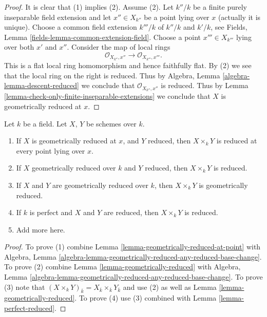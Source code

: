 \begin{proof}
It is clear that (1) implies (2). Assume (2).
Let $k''/k$ be a finite purely inseparable field extension
and let $x'' \in X_{k''}$ be a point lying over $x$ (actually it is
unique). Choose a common field extension $k'''/k$ of $k''/k$ and $k'/k$, see
Fields, Lemma \ref{fields-lemma-common-extension-field}.
Choose a point $x''' \in X_{k'''}$ lying over both $x'$ and $x''$.
Consider the map of local rings
$$
\mathcal{O}_{X_{k''}, x''} \longrightarrow \mathcal{O}_{X_{k'''}, x'''}.
$$
This is a flat local ring homomorphism and hence faithfully flat.
By (2) we see that the local ring on the right is reduced.
Thus by Algebra, Lemma \ref{algebra-lemma-descent-reduced}
we conclude that $\mathcal{O}_{X_{k''}, x''}$ is reduced.
Thus by Lemma \ref{lemma-check-only-finite-inseparable-extensions}
we conclude that $X$ is geometrically reduced at $x$.
\end{proof}

\begin{lemma}
\label{lemma-geometrically-reduced-any-base-change}
Let $k$ be a field. Let $X$, $Y$ be schemes over $k$.
\begin{enumerate}
\item If $X$ is geometrically reduced at $x$, and $Y$ reduced,
then $X \times_k Y$ is reduced at every point lying over $x$.
\item If $X$ geometrically reduced over $k$ and $Y$ reduced, then
$X \times_k Y$ is reduced.
\item If $X$ and $Y$ are geometrically reduced over $k$, then
$X \times_k Y$ is geometrically reduced.
\item If $k$ is perfect and $X$ and $Y$ are reduced, then
$X \times_k Y$ is reduced.
\item Add more here.
\end{enumerate}
\end{lemma}

\begin{proof}
To prove (1) combine Lemma \ref{lemma-geometrically-reduced-at-point}
with Algebra, Lemma
\ref{algebra-lemma-geometrically-reduced-any-reduced-base-change}.
To prove (2) combine Lemma \ref{lemma-geometrically-reduced}
with Algebra, Lemma
\ref{algebra-lemma-geometrically-reduced-any-reduced-base-change}.
To prove (3) note that
$(X \times_k Y)_{\overline{k}} =
X_{\overline{k}} \times_{\overline{k}} Y_{\overline{k}}$
and use (2) as well as Lemma \ref{lemma-geometrically-reduced}.
To prove (4) use (3) combined with Lemma \ref{lemma-perfect-reduced}.
\end{proof}

